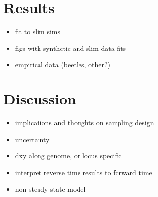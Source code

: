 \documentclass{article}
\begin{document}
\section{Results}

\begin{itemize}
    \item fit to slim sims
    \item figs with synthetic and slim data fits
    \item empirical data (beetles, other?)
\end{itemize}


\section{Discussion}

\begin{itemize}
    \item implications and thoughts on sampling design
    \item uncertainty
    \item dxy along genome, or locus specific
    \item interpret reverse time results to forward time
    \item non steady-state model
\end{itemize}




\end{document}
